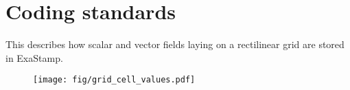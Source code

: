 \section{Coding standards}
\label{sec:coding_stabdards}


This describes how scalar and vector fields laying on a rectilinear grid are stored in ExaStamp.

\begin{figure}[!h]
  \centering
  \texttt{[image: fig/grid\_cell\_values.pdf]} \\
\end{figure}

